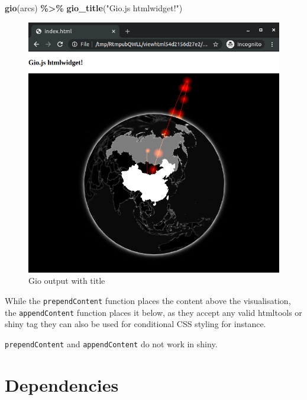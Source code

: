 \documentclass[
]{krantz}
\makeatletter
\newenvironment{Shaded}{\begin{snugshade}}{\end{snugshade}}
\newcommand{\KeywordTok}[1]{\textcolor[rgb]{0.27,0.27,0.27}{\textbf{#1}}}
\newcommand{\NormalTok}[1]{#1}
\newcommand{\OperatorTok}[1]{\textcolor[rgb]{0.43,0.43,0.43}{\textbf{#1}}}
\newcommand{\StringTok}[1]{\textcolor[rgb]{0.5,0.5,0.5}{#1}}
\newenvironment{kframe}{%
\medskip{}
\setlength{\fboxsep}{.8em}
 \def\at@end@of@kframe{}%
 \ifinner\ifhmode%
  \def\at@end@of@kframe{\end{minipage}}%
  \begin{minipage}{\columnwidth}%
 \fi\fi%
 \def\FrameCommand##1{\hskip\@totalleftmargin \hskip-\fboxsep
 \colorbox{shadecolor}{##1}\hskip-\fboxsep
     \hskip-\linewidth \hskip-\@totalleftmargin \hskip\columnwidth}%
 \MakeFramed {\advance\hsize-\width
   \@totalleftmargin\z@ \linewidth\hsize
   \@setminipage}}%
 {\par\unskip\endMakeFramed%
 \at@end@of@kframe}
\renewenvironment{Shaded}{\begin{kframe}}{\end{kframe}}
\newenvironment{rmdblock}[1]
  {
  \begin{itemize}
  \renewcommand{\labelitemi}{
    \raisebox{-.7\height}[0pt][0pt]{
      {\setkeys{Gin}{width=3em,keepaspectratio}\texttt{[image: images/\#1]}}
    }
  }
  \setlength{\fboxsep}{1em}
  \begin{kframe}
  \item
  }
  {
  \end{kframe}
  \end{itemize}
  }
\newenvironment{rmdnote}
  {\begin{rmdblock}{note}}
  {\end{rmdblock}}
\makeatother
\begin{document}
\begin{Shaded}
\begin{Highlighting}[]
\KeywordTok{gio}\NormalTok{(arcs) }\OperatorTok{\%>\%}\StringTok{ }
\StringTok{  }\KeywordTok{gio\_title}\NormalTok{(}\StringTok{"Gio.js htmlwidget!"}\NormalTok{)}
\end{Highlighting}
\end{Shaded}

\begin{figure}[t]

{\centering \includegraphics[width=1\linewidth]{images/gio-title} 

}

\caption{Gio output with title}\label{fig:gio-title}
\end{figure}

While the \texttt{prependContent} function places the content above the visualisation, the \texttt{appendContent} function places it below, as they accept any valid htmltools or shiny tag they can also be used for conditional CSS styling for instance.

\begin{rmdnote}
\texttt{prependContent} and \texttt{appendContent} do not work in shiny.
\end{rmdnote}

\hypertarget{widgets-adv-dependencies}{%
\section{Dependencies}\label{widgets-adv-dependencies}}
\end{document}
